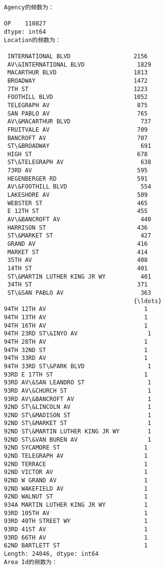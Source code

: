 \documentclass[11pt]{article}
\begin{document}
    \begin{Verbatim}[commandchars=\\\{\}]
Agency的频数为：

OP    110827
dtype: int64
Location的频数为：

 INTERNATIONAL BLVD                  2156
 AV\&INTERNATIONAL BLVD               1829
 MACARTHUR BLVD                      1813
 BROADWAY                            1472
 7TH ST                              1223
 FOOTHILL BLVD                       1052
 TELEGRAPH AV                         875
 SAN PABLO AV                         765
 AV\&MACARTHUR BLVD                    737
 FRUITVALE AV                         709
 BANCROFT AV                          707
 ST\&BROADWAY                          691
 HIGH ST                              678
 ST\&TELEGRAPH AV                      638
 73RD AV                              595
 HEGENBERGER RD                       591
 AV\&FOOTHILL BLVD                     554
 LAKESHORE AV                         509
 WEBSTER ST                           465
 E 12TH ST                            455
 AV\&BANCROFT AV                       440
 HARRISON ST                          436
 ST\&MARKET ST                         427
 GRAND AV                             416
 MARKET ST                            414
 35TH AV                              408
 14TH ST                              401
 ST\&MARTIN LUTHER KING JR WY          401
 34TH ST                              371
 ST\&SAN PABLO AV                      363
                                     {\ldots} 
94TH 12TH AV                            1
94TH 13TH AV                            1
94TH 16TH AV                            1
94TH 23RD ST\&INYO AV                    1
94TH 28TH AV                            1
94TH 32ND ST                            1
94TH 33RD AV                            1
94TH 33RD ST\&PARK BLVD                  1
93RD E 17TH ST                          1
93RD AV\&SAN LEANDRO ST                  1
93RD AV\&CHURCH ST                       1
93RD AV\&BANCROFT AV                     1
92ND ST\&LINCOLN AV                      1
92ND ST\&MADISON ST                      1
92ND ST\&MARKET ST                       1
92ND ST\&MARTIN LUTHER KING JR WY        1
92ND ST\&VAN BUREN AV                    1
92ND SYCAMORE ST                        1
92ND TELEGRAPH AV                       1
92ND TERRACE                            1
92ND VICTOR AV                          1
92ND W GRAND AV                         1
92ND WAKEFIELD AV                       1
92ND WALNUT ST                          1
934A MARTIN LUTHER KING JR WY           1
93RD 105TH AV                           1
93RD 40TH STREET WY                     1
93RD 41ST AV                            1
93RD 66TH AV                            1
62ND BARTLETT ST                        1
Length: 24046, dtype: int64
Area Id的频数为：


\end{Verbatim}
\end{document}
